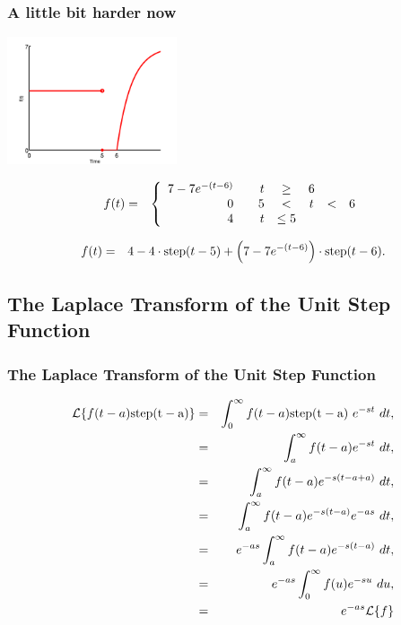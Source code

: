 \begin{frame}
  \frametitle{A little bit harder now}

  \centerline{\includegraphics[width=5cm]{img/stepEx6}}

  \begin{eqnarray*}
      f(t) & = & 
      \left\{
        \begin{array}{r@{\hspace{2em}}rcccl}
          7-7e^{-(t-6)} & t & \geq & 6 \\
          0 & 5 & < & t & < & 6 \\
          4 & t & \leq 5 
        \end{array}
      \right.
  \end{eqnarray*}

  {
    \begin{eqnarray*}
      f(t) & = & 4 - 4\cdot\mathrm{step}(t-5) + \left( 7-7e^{-(t-6)}\right)\cdot\mathrm{step}(t-6).
    \end{eqnarray*}
  }


\end{frame}


\subsection{The Laplace Transform of the Unit Step Function}

\begin{frame}
  \frametitle{The Laplace Transform of the Unit Step Function}

  \begin{eqnarray*}
    \laplace{f(t-a)\mathrm{step(t-a)}} & = & 
           \int^\infty_0 f(t-a)\mathrm{step(t-a)} ~ e^{-st} ~ dt, \\
    & = &  \int^\infty_a f(t-a) e^{-st} ~ dt, \\
    & = & \int^\infty_a f(t-a) e^{-s(t-a+a)} ~ dt, \\
    & = & \int^\infty_a f(t-a) e^{-s(t-a)}e^{-as} ~ dt, \\
    & = & e^{-as} \int^\infty_a f(t-a) e^{-s(t-a)} ~ dt, \\
    & = & e^{-as} \int^\infty_0 f(u) e^{-su} ~ du, \\
    & = & e^{-as} \laplace{f} \\
  \end{eqnarray*}

\end{frame}



